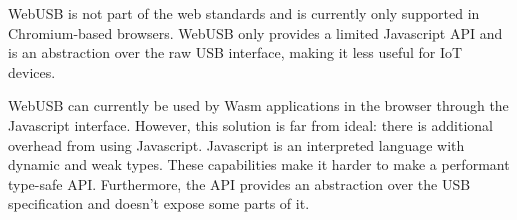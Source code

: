 WebUSB is not part of the web standards and is currently only supported in Chromium-based browsers. WebUSB only provides a limited Javascript API and is an abstraction over the raw USB interface, making it less useful for \acrshort{IoT} devices.

WebUSB can currently be used by Wasm applications in the browser through the Javascript interface. However, this solution is far from ideal: there is additional overhead from using Javascript. Javascript is an interpreted language with dynamic and weak types. These capabilities make it harder to make a performant type-safe API. Furthermore, the API provides an abstraction over the USB specification and doesn't expose some parts of it.